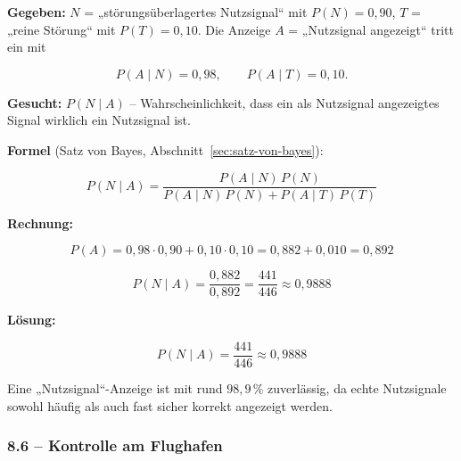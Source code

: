 \begin{beispiel}

\textbf{Gegeben:} $N$ = „störungsüberlagertes Nutzsignal`` mit $P(N) = 0{,}90$,
$T$ = „reine Störung`` mit $P(T) = 0{,}10$. Die Anzeige $A$ = „Nutzsignal
angezeigt`` tritt ein mit

$$
P(A \mid N) = 0{,}98, \qquad P(A \mid T) = 0{,}10 .
$$

\textbf{Gesucht:} $P(N \mid A)$ -- Wahrscheinlichkeit, dass ein als Nutzsignal
angezeigtes Signal wirklich ein Nutzsignal ist.

\textbf{Formel} (Satz von Bayes, Abschnitt~\ref{sec:satz-von-bayes}):

$$
P(N \mid A) = \frac{P(A \mid N)\,P(N)}{P(A \mid N)\,P(N) + P(A \mid T)\,P(T)}
$$

\textbf{Rechnung:}

$$
P(A) = 0{,}98 \cdot 0{,}90 + 0{,}10 \cdot 0{,}10 = 0{,}882 + 0{,}010 = 0{,}892
$$

$$
P(N \mid A) = \frac{0{,}882}{0{,}892} = \frac{441}{446} \approx 0{,}9888
$$

\textbf{Lösung:}

$$
\boxed{P(N \mid A) = \frac{441}{446} \approx 0{,}9888}
$$

Eine „Nutzsignal``-Anzeige ist mit rund $98{,}9\,\%$ zuverlässig, da echte
Nutzsignale sowohl häufig als auch fast sicher korrekt angezeigt werden.

\end{beispiel}

\subsubsection*{8.6 – Kontrolle am Flughafen}


